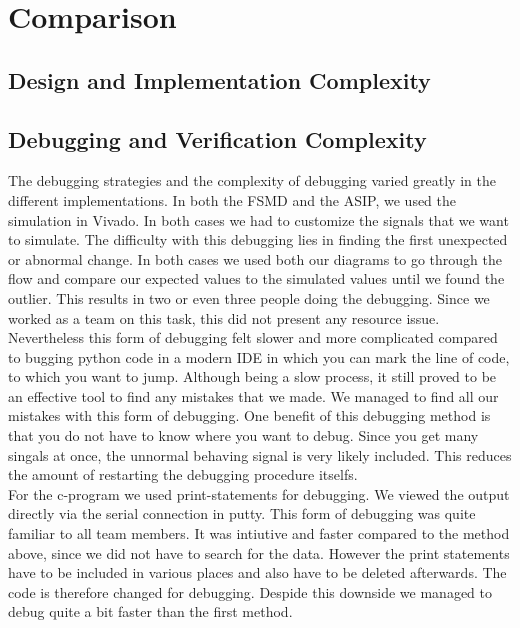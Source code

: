 \documentclass[conference]{IEEEtran}
\begin{document}
\section{Comparison}
\subsection{Design and Implementation Complexity}
\subsection{Debugging and Verification Complexity}
The debugging strategies and the complexity of debugging varied greatly in the different implementations. In both the FSMD and the ASIP, we used the simulation in Vivado. In both cases we had to customize the signals that we want to simulate. The difficulty with this debugging lies in finding the first unexpected or abnormal change. In both cases we used both our diagrams to go through the flow and compare our expected values to the simulated values until we found the outlier. This results in two or even three people doing the debugging. Since we worked as a team on this task, this did not present any resource issue. Nevertheless this form of debugging felt slower and more complicated compared to bugging python code in a modern IDE in which you can mark the line of code, to which you want to jump. Although being a slow process, it still proved to be an effective tool to find any mistakes that we made. We managed to find all our mistakes with this form of debugging. One benefit of this debugging method is that you do not have to know where you want to debug. Since you get many singals at once, the unnormal behaving signal is very likely included. This reduces the amount of restarting the debugging procedure itselfs. \\
For the c-program we used print-statements for debugging. We viewed the output directly via the serial connection in putty. This form of debugging was quite familiar to all team members. It was intiutive and faster compared to the method above, since we did not have to search for the data. However the print statements have to be included in various places and also have to be deleted afterwards. The code is therefore changed for debugging. Despide this downside we managed to debug quite a bit faster than the first method. \\
\end{document}

